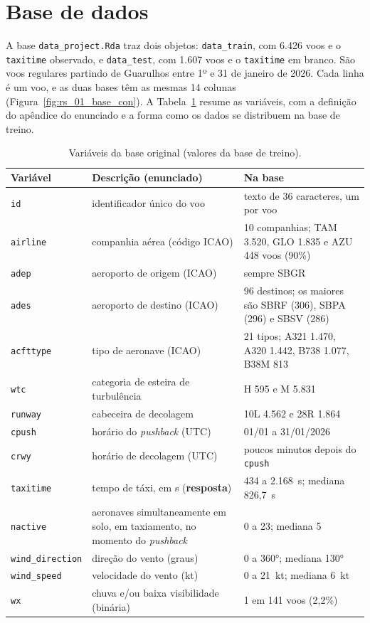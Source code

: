 \documentclass[12pt,a4paper]{article}
\begin{document}
\section{Base de dados}\label{sec:base}

A base \texttt{data\_project.Rda} traz dois objetos: \texttt{data\_train}, com 6.426 voos e o \texttt{taxitime} observado, e \texttt{data\_test}, com 1.607 voos e o \texttt{taxitime} em branco. São voos regulares partindo de Guarulhos entre 1º e 31 de janeiro de 2026. Cada linha é um voo, e as duas bases têm as mesmas 14 colunas (Figura~\ref{fig:rs_01_base_con}). A Tabela~\ref{tab:variaveis} resume as variáveis, com a definição do apêndice do enunciado e a forma como os dados se distribuem na base de treino.

\begin{table}[H]\centering\scriptsize
\caption{Variáveis da base original (valores da base de treino).}\label{tab:variaveis}
\begin{tabular}{p{2.6cm}p{5.3cm}p{6.2cm}}
\toprule
Variável & Descrição (enunciado) & Na base\\
\midrule
\texttt{id} & identificador único do voo & texto de 36 caracteres, um por voo\\
\texttt{airline} & companhia aérea (código ICAO) & 10 companhias; TAM 3.520, GLO 1.835 e AZU 448 voos (90\%)\\
\texttt{adep} & aeroporto de origem (ICAO) & sempre SBGR\\
\texttt{ades} & aeroporto de destino (ICAO) & 96 destinos; os maiores são SBRF (306), SBPA (296) e SBSV (286)\\
\texttt{acfttype} & tipo de aeronave (ICAO) & 21 tipos; A321 1.470, A320 1.442, B738 1.077, B38M 813\\
\texttt{wtc} & categoria de esteira de turbulência & H 595 e M 5.831\\
\texttt{runway} & cabeceira de decolagem & 10L 4.562 e 28R 1.864\\
\texttt{cpush} & horário do \textit{pushback} (UTC) & 01/01 a 31/01/2026\\
\texttt{crwy} & horário de decolagem (UTC) & poucos minutos depois do \texttt{cpush}\\
\texttt{taxitime} & tempo de táxi, em s (\textbf{resposta}) & 434 a 2.168~s; mediana 826,7~s\\
\texttt{nactive} & aeronaves simultaneamente em solo, em taxiamento, no momento do \textit{pushback} & 0 a 23; mediana 5\\
\texttt{wind\_direction} & direção do vento (graus) & 0 a 360°; mediana 130°\\
\texttt{wind\_speed} & velocidade do vento (kt) & 0 a 21~kt; mediana 6~kt\\
\texttt{wx} & chuva e/ou baixa visibilidade (binária) & 1 em 141 voos (2,2\%)\\
\bottomrule
\end{tabular}
\end{table}
\end{document}
